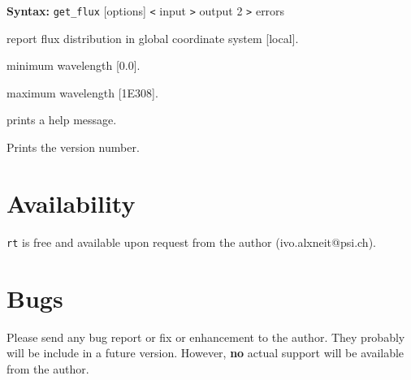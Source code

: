 \documentclass[10pt,a4paper,titlepage]{article}
\newcommand{\rt}{{\tt rt} }
\begin{document}
{\bf Syntax:} {\tt get\_flux} [options] {\tt <} input {\tt >} output 2 {\tt >} errors
\vspace{1em}
\begin{list}{}
{\setlength{\leftmargin}{3.5cm}
\setlength{\labelwidth}{3.0cm}
\setlength{\labelsep}{0.25cm}
\setlength{\rightmargin}{0.5cm}}

\item[{\tt [--global|-g]}] report flux distribution in global coordinate system [local].
\item[{\tt [--minl|-l]}] minimum wavelength [0.0].
\item[{\tt [--maxl|-L]}] maximum wavelength [1E308].
\item[{\tt [--help|-h]}] prints a help message.
\item[{\tt [--Version|-V]}] Prints the version number.

\end{list}


\section{Availability}
\rt is free and available upon request from the author (ivo.alxneit@psi.ch).



\section{Bugs} Please send any bug report or fix or enhancement to the author. They probably will be include in a future version. However, {\bf no} actual support will be available from the author.
\end{document}
